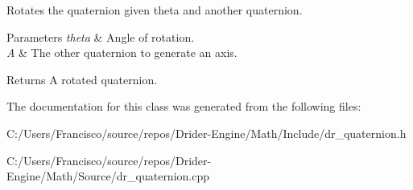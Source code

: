 Rotates the quaternion given theta and another quaternion.


\begin{DoxyParams}{Parameters}
{\em theta} & Angle of rotation.\\
\hline
{\em A} & The other quaternion to generate an axis.\\
\hline
\end{DoxyParams}
\begin{DoxyReturn}{Returns}
A rotated quaternion. 
\end{DoxyReturn}


The documentation for this class was generated from the following files\+:\begin{DoxyCompactItemize}
\item 
C\+:/\+Users/\+Francisco/source/repos/\+Drider-\/\+Engine/\+Math/\+Include/dr\+\_\+quaternion.\+h\item 
C\+:/\+Users/\+Francisco/source/repos/\+Drider-\/\+Engine/\+Math/\+Source/dr\+\_\+quaternion.\+cpp\end{DoxyCompactItemize}
